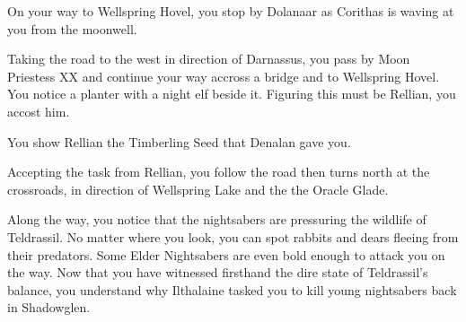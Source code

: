 On your way to Wellspring Hovel, you stop by Dolanaar as Corithas is waving at you from the moonwell.


Taking the road to the west in direction of Darnassus, you pass by Moon Priestess XX and continue your way accross a bridge and to Wellspring Hovel. You notice a planter with a night elf beside it. Figuring this must be Rellian, you accost him. %


You show Rellian the Timberling Seed that Denalan gave you.



Accepting the task from Rellian, you follow the road then turns north at the crossroads, in direction of Wellspring Lake and the the Oracle Glade.

Along the way, you notice that the nightsabers are pressuring the wildlife of Teldrassil. No matter where you look, you can spot rabbits and dears fleeing from their predators. Some Elder Nightsabers are even bold enough to attack you on the way. Now that you have witnessed firsthand the dire state of Teldrassil's balance, you understand why Ilthalaine tasked you to kill young nightsabers back in Shadowglen.

